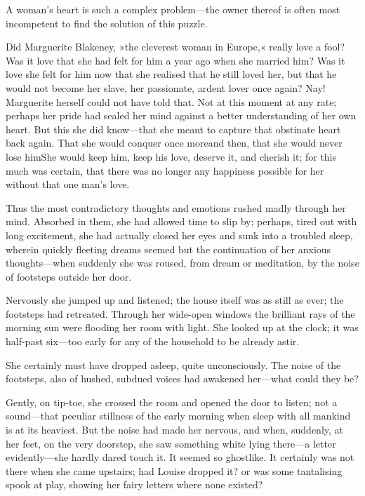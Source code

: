 A woman's heart is such a complex problem—the owner thereof is often most incompetent to find the solution of this puzzle.

Did Marguerite Blakeney, »the cleverest woman in Europe,« really love a fool? Was it love that she had felt for him a year ago when she married him? Was it love she felt for him now that she realised that he still loved her, but that he would not become her slave, her passionate, ardent lover once again? Nay! Marguerite herself could not have told that. Not at this moment at any rate; perhaps her pride had sealed her mind against a better understanding of her own heart. But this she did know—that she meant to capture that obstinate heart back again. That she would conquer once more\textellipsis \allowbreak  and then, that she would never lose him\textellipsis \allowbreak  She would keep him, keep his love, deserve it, and cherish it; for this much was certain, that there was no longer any happiness possible for her without that one man's love.

Thus the most contradictory thoughts and emotions rushed madly through her mind. Absorbed in them, she had allowed time to slip by; perhaps, tired out with long excitement, she had actually closed her eyes and sunk into a troubled sleep, wherein quickly fleeting dreams seemed but the continuation of her anxious thoughts\allowbreak—when suddenly she was roused, from dream or meditation, by the noise of footsteps outside her door.

Nervously she jumped up and listened; the house itself was as still as ever; the footsteps had retreated. Through her wide-open windows the brilliant rays of the morning sun were flooding her room with light. She looked up at the clock; it was half-past six—too early for any of the household to be already astir.

She certainly must have dropped asleep, quite unconsciously. The noise of the footsteps, also of hushed, subdued voices had awakened her—what could they be?

Gently, on tip-toe, she crossed the room and opened the door to listen; not a sound—that peculiar stillness of the early morning when sleep with all mankind is at its heaviest. But the noise had made her nervous, and when, suddenly, at her feet, on the very doorstep, she saw something white lying there—a letter evidently—she hardly dared touch it. It seemed so ghostlike. It certainly was not there when she came upstairs; had Louise dropped it? or was some tantalising spook at play, showing her fairy letters where none existed?

